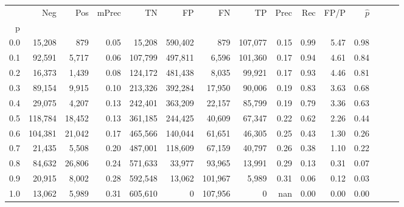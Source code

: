 \begin{tabular}{rrrrrrrrrrrrrrr}
\toprule
{} &      Neg &     Pos & mPrec &       TN &       FP &       FN &       TP &  Prec &   Rec &  FP/P & $\hat{p}$ \\
p   &          &         &       &          &          &          &          &       &       &       &           \\
\midrule
0.0 &   15,208 &     879 &  0.05 &   15,208 &  590,402 &      879 &  107,077 &  0.15 &  0.99 &  5.47 &      0.98 \\
0.1 &   92,591 &   5,717 &  0.06 &  107,799 &  497,811 &    6,596 &  101,360 &  0.17 &  0.94 &  4.61 &      0.84 \\
0.2 &   16,373 &   1,439 &  0.08 &  124,172 &  481,438 &    8,035 &   99,921 &  0.17 &  0.93 &  4.46 &      0.81 \\
0.3 &   89,154 &   9,915 &  0.10 &  213,326 &  392,284 &   17,950 &   90,006 &  0.19 &  0.83 &  3.63 &      0.68 \\
0.4 &   29,075 &   4,207 &  0.13 &  242,401 &  363,209 &   22,157 &   85,799 &  0.19 &  0.79 &  3.36 &      0.63 \\
0.5 &  118,784 &  18,452 &  0.13 &  361,185 &  244,425 &   40,609 &   67,347 &  0.22 &  0.62 &  2.26 &      0.44 \\
0.6 &  104,381 &  21,042 &  0.17 &  465,566 &  140,044 &   61,651 &   46,305 &  0.25 &  0.43 &  1.30 &      0.26 \\
0.7 &   21,435 &   5,508 &  0.20 &  487,001 &  118,609 &   67,159 &   40,797 &  0.26 &  0.38 &  1.10 &      0.22 \\
0.8 &   84,632 &  26,806 &  0.24 &  571,633 &   33,977 &   93,965 &   13,991 &  0.29 &  0.13 &  0.31 &      0.07 \\
0.9 &   20,915 &   8,002 &  0.28 &  592,548 &   13,062 &  101,967 &    5,989 &  0.31 &  0.06 &  0.12 &      0.03 \\
1.0 &   13,062 &   5,989 &  0.31 &  605,610 &        0 &  107,956 &        0 &   nan &  0.00 &  0.00 &      0.00 \\
\bottomrule
\end{tabular}
